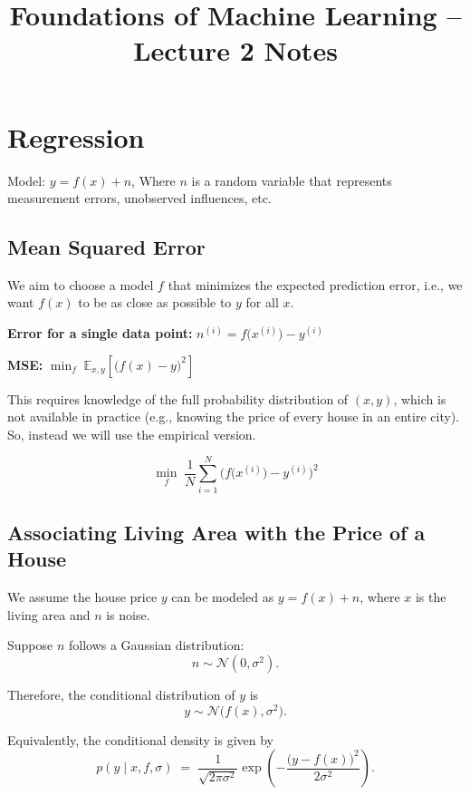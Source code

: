\documentclass[11pt]{article}
\title{Foundations of Machine Learning -- Lecture 2 Notes}
\author{}
\date{}
\begin{document}
\maketitle

\section*{Regression}
Model: $y=f(x)+ n$,
Where $n$ is a random variable that represents measurement errors, unobserved influences, etc.


\subsection*{Mean Squared Error}
We aim to choose a model $f$ that minimizes the expected prediction error, i.e., we want $f(x)$ to be as close as possible to $y$ for all $x$.

\medskip

\textbf{Error for a single data point:}
$n^{(i)} = f\big(x^{(i)}\big) - y^{(i)}$

\textbf{MSE:}
$\min_{f} \; \mathbb{E}_{x,y}\!\left[ \big(f(x) - y\big)^2 \right]$

This requires knowledge of the full probability distribution of $(x,y)$, which is not available in practice (e.g., knowing the price of every house in an entire city).
So, instead we will use the empirical version.

\[
	\min_{f} \; \frac{1}{N} \sum_{i=1}^{N} \Big(f\big(x^{(i)}\big) - y^{(i)}\Big)^2
\]




\subsection*{Associating Living Area with the Price of a House}

We assume the house price $y$ can be modeled as $y = f(x) + n$,
where $x$ is the living area and $n$ is noise.

\medskip

Suppose $n$ follows a Gaussian distribution:
\[
	n \sim \mathcal{N}(0, \sigma^2).
\]

Therefore, the conditional distribution of $y$ is
\[
	y \sim \mathcal{N}\!\big(f(x), \sigma^2\big).
\]

Equivalently, the conditional density is given by
\[
	p(y \mid x, f, \sigma) \;=\; \frac{1}{\sqrt{2\pi\sigma^2}}
	\exp\!\left( -\frac{\big(y - f(x)\big)^2}{2\sigma^2} \right).
\]
\end{document}
